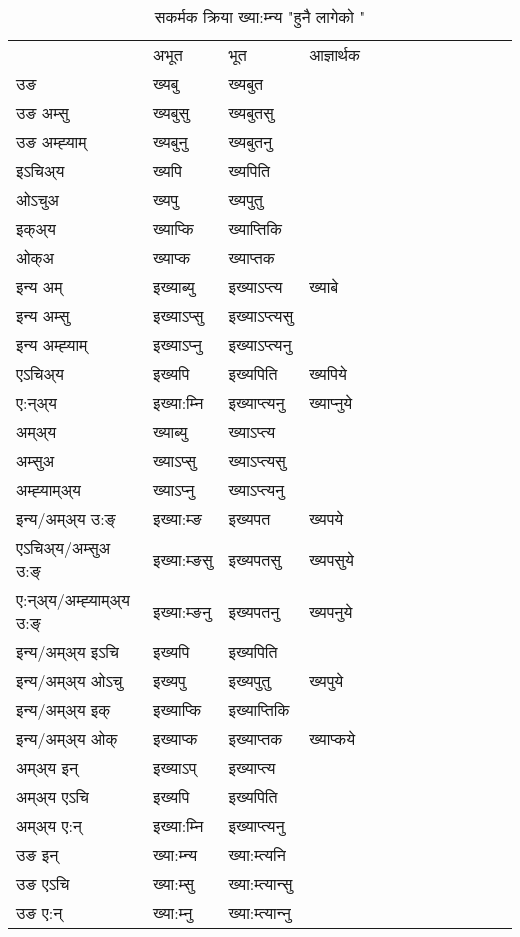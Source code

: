 \begin{table}[H]
\label{ɛp.vt} \centering
\caption{सकर्मक क्रिया  ख्या:म्‍न्य  "हुनै लागेको "  }
\begin{tabular}{l|l|l|l|l|l|l|l|l|l|l|l|l}  \toprule
&अभूत & भूत & आज्ञार्थक \\ 
उङ &ख्यबु &ख्यबुत \\ 
उङ अम्सु &ख्यबुसु &ख्यबुतसु \\ 
उङ अम्ह्‍याम् &ख्यबुनु &ख्यबुतनु \\ 
इऽचिअ्य &ख्यपि &ख्यपिति   \\ 
ओऽचुअ &ख्यपु &ख्यपुतु   \\ 
इक्अ्य &ख्याप्कि &ख्याप्‍तिकि   \\ 
ओक्अ &ख्याप्क &ख्याप्‍तक   \\ 
इन्य अम् & इख्याब्यु  & इख्याऽप्‍त्य &ख्याबे  \\ 
इन्य अम्सु & इख्याऽप्सु  & इख्याऽप्‍त्यसु   \\ 
इन्य अम्ह्‍याम् & इख्याऽप्‍नु  & इख्याऽप्‍त्यनु   \\ 
एऽचिअ्य & इख्यपि & इख्यपिति &ख्यपिये    \\ 
ए:न्अ्य & इख्या:म्‍नि  & इख्याप्‍त्यनु &ख्याप्‍नुये  \\ 
अम्अ्य & ख्याब्यु  & ख्याऽप्‍त्य  \\ 
अम्सुअ & ख्याऽप्सु & ख्याऽप्‍त्यसु  \\ 
अम्ह्‍याम्अ्य & ख्याऽप्‍नु  & ख्याऽप्‍त्यनु \\ 
\midrule
इन्य/अम्अ्य उ:ङ्‌&इख्या:म्ङ & इख्यपत &ख्यपये \\ 
एऽचिअ्य/अम्सुअ उ:ङ्‌ &इख्या:म्ङसु & इख्यपतसु &ख्यपसुये \\ 
ए:न्अ्य/अम्ह्‍याम्अ्य उ:ङ्‌ &इख्या:म्ङनु & इख्यपतनु &ख्यपनुये \\ 
इन्य/अम्अ्य इऽचि & इख्यपि & इख्यपिति    \\ 
इन्य/अम्अ्य ओऽचु & इख्यपु & इख्यपुतु  &ख्यपुये  \\ 
इन्य/अम्अ्य इक् & इख्याप्कि & इख्याप्‍तिकि   \\ 
इन्य/अम्अ्य ओक् & इख्याप्क & इख्याप्‍तक  &ख्याप्कये  \\ 
अम्अ्य इन् & इख्याऽप् & इख्याप्‍त्य   \\ 
अम्अ्य एऽचि & इख्यपि & इख्यपिति    \\ 
अम्अ्य ए:न् & इख्या:म्‍नि  & इख्याप्‍त्यनु  \\ 
\midrule
उङ इन् & ख्या:म्‍न्य  & ख्या:म्त्यनि  \\ 
उङ एऽचि & ख्या:म्सु  & ख्या:म्त्यान्सु   \\ 
उङ ए:न्& ख्या:म्‍नु  & ख्या:म्त्यान्‍नु   \\ 
\bottomrule
\end{tabular}
\end{table}


